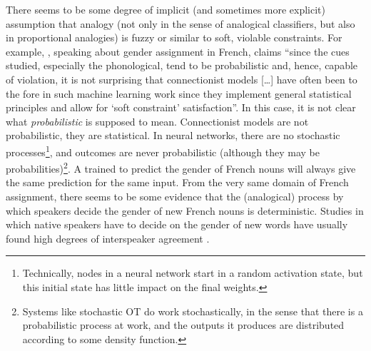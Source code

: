 There seems to be some degree of implicit (and sometimes more explicit) assumption that analogy (not only in the sense of analogical classifiers, but also in proportional analogies) is fuzzy or similar to soft, violable constraints. For example, \textcite[880]{Matthews.2010}, speaking about gender assignment in French, claims ``since the cues studied, especially the phonological, tend to be probabilistic and, hence, capable of violation, it is not surprising that connectionist models [\dots] have often been to the fore in such machine learning work since they implement general statistical principles and allow for `soft constraint' satisfaction''. In this case, it is not clear what \textit{probabilistic} is supposed to mean. Connectionist models are not probabilistic, they are statistical. In neural networks, there are no stochastic processes\footnote{Technically, nodes in a neural network start in a random activation state, but this initial state has little impact on the final weights.}, and outcomes are never probabilistic (although they may be probabilities)\footnote{Systems like stochastic OT \autocites{Boersma.1997, Boersma.1998, Boersma.2001} do work stochastically, in the sense that there is a probabilistic process at work, and the outputs it produces are distributed according to some density function.}. A  trained to predict the gender of French nouns will always give the same prediction for the same input. From the very same domain of French  assignment, there seems to be some evidence that the (analogical) process by which speakers decide the gender of new French nouns is deterministic. Studies in which native speakers have to decide on the gender of new words have usually found high degrees of interspeaker agreement \autocites{Tucker.1968, Tucker.1977, Holmes.1999}.

